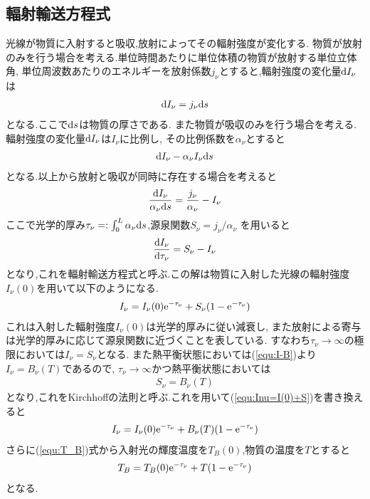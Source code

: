 \subsection{輻射輸送方程式}
\label{subsec:hukusyayuso}
光線が物質に入射すると吸収,放射によってその輻射強度が変化する.
物質が放射のみを行う場合を考える.単位時間あたりに単位体積の物質が放射する単位立体角,
単位周波数あたりのエネルギーを放射係数$j_{\nu}$とすると,輻射強度の変化量${\rm d}I_{\nu}$は
\begin{align}
  {\rm d}I_{\nu}=j_{\nu}{\rm d}s
\end{align}
となる.ここで${\rm d}s$は物質の厚さである.
また物質が吸収のみを行う場合を考える.輻射強度の変化量${\rm d}I_{\nu}$は$I_{\nu}$に比例し,
その比例係数を$\alpha_{\nu}$とすると
\begin{align}
  {\rm d}I_{\nu}-\alpha_{\nu}I_{\nu}{\rm d}s
\end{align}
となる.以上から放射と吸収が同時に存在する場合を考えると
\begin{align}
  \frac{{\rm d}I_{\nu}}{\alpha_{\nu}{\rm d}s}=\frac{j_{\nu}}{\alpha_{\nu}}-I_{\nu}
\end{align}
ここで光学的厚み$\tau_{\nu}=:\int_0^L\alpha_{\nu}{\rm d}s$,源泉関数$S_{\nu}=j_{\nu}/\alpha_{\nu}$
を用いると
\begin{align}
  \frac{{\rm d}I_{\nu}}{{\rm d}\tau_{\nu}}=S_{\nu}-I_{\nu}
\end{align}
となり,これを輻射輸送方程式と呼ぶ.この解は物質に入射した光線の輻射強度$I_{\nu}(0)$を用いて以下のようになる.
\begin{align}
  \label{equ:Inu=I(0)+S}
  I_{\nu}=I_{\nu}(0){\rm e}^{-\tau_{\nu}}+S_{\nu}(1-{\rm e}^{-\tau_{\nu}})
\end{align}
これは入射した輻射強度$I_{\nu}(0)$は光学的厚みに従い減衰し,
また放射による寄与は光学的厚みに応じて源泉関数に近づくことを表している.
すなわち$\tau_{\nu}\rightarrow\infty$の極限においては$I_{\nu}=S_{\nu}$となる.
また熱平衡状態においては(\ref{equ:I-B})より$I_\nu=B_\nu(T)$であるので,
$\tau_{\nu}\rightarrow\infty$かつ熱平衡状態においては
\begin{align}
  S_\nu=B_\nu(T)
\end{align}
となり,これをKirchhoffの法則と呼ぶ.これを用いて(\ref{equ:Inu=I(0)+S})を書き換えると
\begin{align}
  I_\nu=I_\nu(0){\rm e}^{-\tau_{\nu}}+B_\nu(T)(1-{\rm e}^{-\tau_{\nu}})
\end{align}
さらに(\ref{equ:T_B})式から入射光の輝度温度を$T_B(0)$,物質の温度を$T$とすると
\begin{align}
  T_B=T_B(0){\rm e}^{-\tau_{\nu}}+T(1-{\rm e}^{-\tau_{\nu}})
\end{align}
となる.